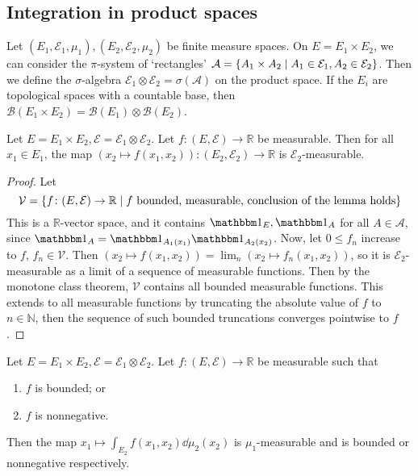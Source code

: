 \subsection{Integration in product spaces}
Let \( (E_1, \mathcal E_1, \mu_1), (E_2, \mathcal E_2, \mu_2) \) be finite measure spaces.
On \( E = E_1 \times E_2 \), we can consider the \( \pi \)-system of `rectangles' \( \mathcal A = \qty{A_1 \times A_2 \mid A_1 \in \mathcal E_1, A_2 \in \mathcal E_2} \).
Then we define the \( \sigma \)-algebra \( \mathcal E_1 \otimes \mathcal E_2 = \sigma(\mathcal A) \) on the product space.
If the \( E_i \) are topological spaces with a countable base, then \( \mathcal B(E_1 \times E_2) = \mathcal B(E_1) \otimes \mathcal B(E_2) \).
\begin{lemma}
	Let \( E = E_1 \times E_2, \mathcal E = \mathcal E_1 \otimes \mathcal E_2 \).
	Let \( f \colon (E, \mathcal E) \to \mathbb R \) be measurable.
	Then for all \( x_1 \in E_1 \), the map \( (x_2 \mapsto f(x_1, x_2)) \colon (E_2, \mathcal E_2) \to \mathbb R \) is \( \mathcal E_2 \)-measurable.
\end{lemma}
\begin{proof}
	Let
	\[ \mathcal V = \qty{f \colon (E,\mathcal E) \to \mathbb R \mid f \text{ bounded, measurable, conclusion of the lemma holds}} \]
	This is a \( \mathbb R \)-vector space, and it contains \( \mathbbm 1_E, \mathbbm 1_A \) for all \( A \in \mathcal A \), since \( \mathbbm 1_A = \mathbbm 1_{A_1(x_1)} \mathbbm 1_{A_2(x_2)} \).
	Now, let \( 0 \leq f_n \) increase to \( f \), \( f_n \in \mathcal V \).
	Then \( (x_2 \mapsto f(x_1, x_2)) = \lim_n (x_2 \mapsto f_n(x_1, x_2)) \), so it is \( \mathcal E_2 \)-measurable as a limit of a sequence of measurable functions.
	Then by the monotone class theorem, \( \mathcal V \) contains all bounded measurable functions.
	This extends to all measurable functions by truncating the absolute value of \( f \) to \( n \in \mathbb N \), then the sequence of such bounded truncations converges pointwise to \( f \).
\end{proof}
\begin{lemma}
	Let \( E = E_1 \times E_2, \mathcal E = \mathcal E_1 \otimes \mathcal E_2 \).
	Let \( f \colon (E, \mathcal E) \to \mathbb R \) be measurable such that
	\begin{enumerate}
		\item \( f \) is bounded; or
		\item \( f \) is nonnegative.
	\end{enumerate}
	Then the map \( x_1 \mapsto \int_{E_2} f(x_1,x_2) \dd{\mu_2(x_2)} \) is \( \mu_1 \)-measurable and is bounded or nonnegative respectively.
\end{lemma}
